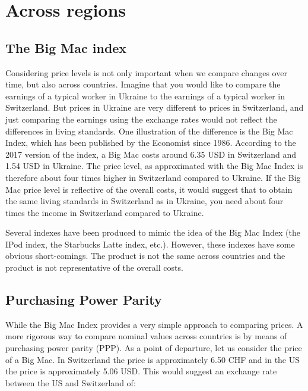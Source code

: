 \documentclass[
]{book}
\begin{document}
\hypertarget{across-regions}{%
\section{Across regions}\label{across-regions}}

\hypertarget{the-big-mac-index}{%
\subsection*{The Big Mac index}\label{the-big-mac-index}}

Considering price levels is not only important when we compare changes over time, but also across countries. Imagine that you would like to compare the earnings of a typical worker in Ukraine to the earnings of a typical worker in Switzerland. But prices in Ukraine are very different to prices in Switzerland, and just comparing the earnings using the exchange rates would not reflect the differences in living standards. One illustration of the difference is the Big Mac Index, which has been published by the Economist since 1986. According to the 2017 version of the index, a Big Mac costs around 6.35 USD in Switzerland and 1.54 USD in Ukraine. The price level, as approximated with the Big Mac Index is therefore about four times higher in Switzerland compared to Ukraine. If the Big Mac price level is reflective of the overall costs, it would suggest that to obtain the same living standards in Switzerland as in Ukraine, you need about four times the income in Switzerland compared to Ukraine.

Several indexes have been produced to mimic the idea of the Big Mac Index (the IPod index, the Starbucks Latte index, etc.). However, these indexes have some obvious short-comings. The product is not the same across countries and the product is not representative of the overall costs.

\hypertarget{purchasing-power-parity}{%
\subsection*{Purchasing Power Parity}\label{purchasing-power-parity}}

While the Big Mac Index provides a very simple approach to comparing prices. A more rigorous way to compare nominal values across countries is by means of purchasing power parity (PPP). As a point of departure, let us consider the price of a Big Mac. In Switzerland the price is approximately 6.50 CHF and in the US the price is approximately 5.06 USD. This would suggest an exchange rate between the US and Switzerland of:
\end{document}
